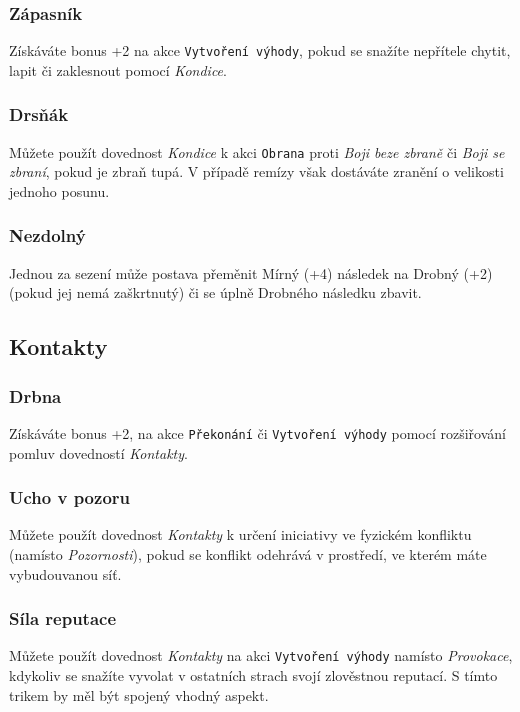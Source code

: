 \subsubsection{Zápasník}
\label{sec:kondice-zapas}
Získáváte bonus +2 na akce \texttt{Vytvoření výhody}, pokud se snažíte nepřítele chytit, lapit či zaklesnout pomocí \textit{Kondice}.

\subsubsection{Drsňák}
\label{sec:kondice-drsnak}
Můžete použít dovednost \textit{Kondice} k akci \texttt{Obrana} proti \textit{Boji beze zbraně} či \textit{Boji se zbraní}, pokud je zbraň tupá. V případě remízy však dostáváte zranění o velikosti jednoho posunu.

\subsubsection{Nezdolný}
\label{sec:kondice-nezdolny}
Jednou za sezení může postava přeměnit Mírný (+4) následek na Drobný (+2) (pokud jej nemá zaškrtnutý) či se úplně Drobného následku zbavit.


\subsection{Kontakty}
\label{sec:trik-kontakty}

\subsubsection{Drbna}
\label{sec:kontakty-drbna}
Získáváte bonus +2, na akce \texttt{Překonání} či \texttt{Vytvoření výhody} pomocí rozšiřování pomluv dovedností \textit{Kontakty}.

\subsubsection{Ucho v pozoru}
\label{sec:kontakty-ucho}
Můžete použít dovednost \textit{Kontakty} k určení iniciativy ve fyzickém konfliktu (namísto \textit{Pozornosti}), pokud se konflikt odehrává v prostředí, ve kterém máte vybudouvanou síť.

\subsubsection{Síla reputace}
\label{sec:kontakty-reputace}
Můžete použít dovednost \textit{Kontakty} na akci \texttt{Vytvoření výhody} namísto \textit{Provokace}, kdykoliv se snažíte vyvolat v ostatních strach svojí zlověstnou reputací. S tímto trikem by měl být spojený vhodný aspekt.

